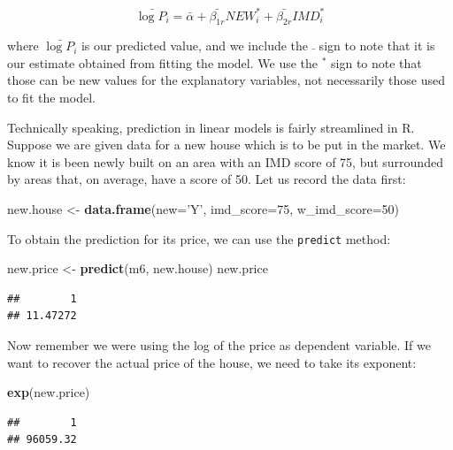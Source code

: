 \documentclass[]{book}
\newenvironment{Shaded}{\begin{snugshade}}{\end{snugshade}}
\newcommand{\KeywordTok}[1]{\textcolor[rgb]{0.13,0.29,0.53}{\textbf{#1}}}
\newcommand{\DataTypeTok}[1]{\textcolor[rgb]{0.13,0.29,0.53}{#1}}
\newcommand{\DecValTok}[1]{\textcolor[rgb]{0.00,0.00,0.81}{#1}}
\newcommand{\StringTok}[1]{\textcolor[rgb]{0.31,0.60,0.02}{#1}}
\newcommand{\NormalTok}[1]{#1}
\begin{document}
\[
\bar{\log{P_i}} = \bar{\alpha} + \bar{\beta_{1r}} NEW_i^* + \bar{\beta_{2r}} IMD_i^*
\]

where \(\bar{\log{P_i}}\) is our predicted value, and we include the
\(\bar{}\) sign to note that it is our estimate obtained from fitting
the model. We use the \(^*\) sign to note that those can be new values
for the explanatory variables, not necessarily those used to fit the
model.

Technically speaking, prediction in linear models is fairly streamlined
in R. Suppose we are given data for a new house which is to be put in
the market. We know it is been newly built on an area with an IMD score
of 75, but surrounded by areas that, on average, have a score of 50. Let
us record the data first:

\begin{Shaded}
\begin{Highlighting}[]
\NormalTok{new.house <-}\StringTok{ }\KeywordTok{data.frame}\NormalTok{(}\DataTypeTok{new=}\StringTok{'Y'}\NormalTok{, }\DataTypeTok{imd_score=}\DecValTok{75}\NormalTok{, }\DataTypeTok{w_imd_score=}\DecValTok{50}\NormalTok{)}
\end{Highlighting}
\end{Shaded}

To obtain the prediction for its price, we can use the \texttt{predict}
method:

\begin{Shaded}
\begin{Highlighting}[]
\NormalTok{new.price <-}\StringTok{ }\KeywordTok{predict}\NormalTok{(m6, new.house)}
\NormalTok{new.price}
\end{Highlighting}
\end{Shaded}

\begin{verbatim}
##        1 
## 11.47272
\end{verbatim}

Now remember we were using the log of the price as dependent variable.
If we want to recover the actual price of the house, we need to take its
exponent:

\begin{Shaded}
\begin{Highlighting}[]
\KeywordTok{exp}\NormalTok{(new.price)}
\end{Highlighting}
\end{Shaded}

\begin{verbatim}
##        1 
## 96059.32
\end{verbatim}
\end{document}
